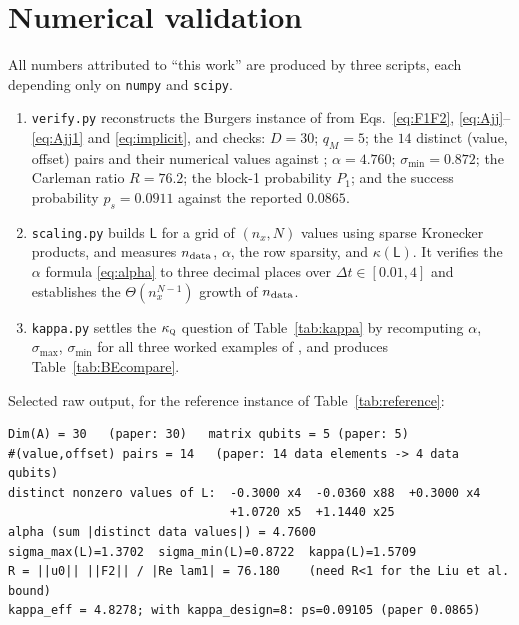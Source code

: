 \documentclass[11pt,a4paper]{article}
\theoremstyle{plain}
\theoremstyle{definition}
\theoremstyle{remark}
\newcommand{\Lmat}{\mathsf{L}}
\newcommand{\kQ}{\kappa_{\textsc{q}}}
\begin{document}
\section{Numerical validation}
\label{app:numerics}

All numbers attributed to ``this work'' are produced by three scripts, each
depending only on \texttt{numpy} and \texttt{scipy}.

\begin{enumerate}[leftmargin=*]
\item \texttt{verify.py} reconstructs the Burgers instance of
\cite[§4.3]{Setty2026} from Eqs.~\eqref{eq:F1F2}, \eqref{eq:Ajj}--\eqref{eq:Ajj1}
and \eqref{eq:implicit}, and checks: $D=30$; $q_M=5$; the $14$ distinct
(value, offset) pairs and their numerical values against
\cite[Table~3]{Setty2026}; $\alpha=4.760$; $\sigma_{\min}=0.872$; the Carleman
ratio $R=76.2$; the block-1 probability $P_1$; and the success probability
$p_s=0.0911$ against the reported $0.0865$.
\item \texttt{scaling.py} builds $\Lmat$ for a grid of $(n_x,N)$ values using
sparse Kronecker products, and measures $n_{\rm data}$, $\alpha$, the row
sparsity, and $\kappa(\Lmat)$.  It verifies the $\alpha$ formula
\eqref{eq:alpha} to three decimal places over $\Delta t\in[0.01,4]$ and
establishes the $\Theta(n_x^{N-1})$ growth of $n_{\rm data}$.
\item \texttt{kappa.py} settles the $\kQ$ question of Table~\ref{tab:kappa} by
recomputing $\alpha$, $\sigma_{\max}$, $\sigma_{\min}$ for all three worked
examples of \cite{Setty2026}, and produces Table~\ref{tab:BEcompare}.
\end{enumerate}

Selected raw output, for the reference instance of Table~\ref{tab:reference}:
\begin{verbatim}
Dim(A) = 30   (paper: 30)   matrix qubits = 5 (paper: 5)
#(value,offset) pairs = 14   (paper: 14 data elements -> 4 data qubits)
distinct nonzero values of L:  -0.3000 x4  -0.0360 x88  +0.3000 x4
                               +1.0720 x5  +1.1440 x25
alpha (sum |distinct data values|) = 4.7600
sigma_max(L)=1.3702  sigma_min(L)=0.8722  kappa(L)=1.5709
R = ||u0|| ||F2|| / |Re lam1| = 76.180    (need R<1 for the Liu et al. bound)
kappa_eff = 4.8278; with kappa_design=8: ps=0.09105 (paper 0.0865)
\end{verbatim}
\end{document}
